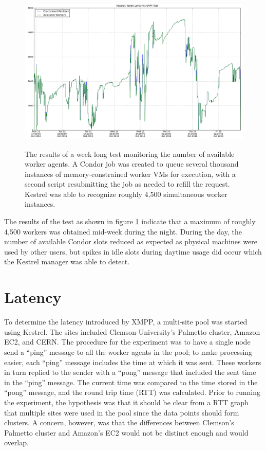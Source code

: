 \begin{figure}
\includegraphics[width=\columnwidth]{figures/week_plot}
\label{fig:Week-Plot}
\caption{The results of a week long test monitoring the number of available
worker agents. A Condor job was created to queue several thousand instances of
memory-constrained worker VMs for execution, with a second script resubmitting
the job as needed to refill the request. Kestrel was able to recognize roughly
4,500 simultaneous worker instances.}
\end{figure}

The results of the test as shown in figure \ref{fig:Week-Plot} indicate that a
maximum of roughly 4,500 workers was obtained mid-week during the night. During
the day, the number of available Condor slots reduced as expected as physical
machines were used by other users, but spikes in idle slots during daytime usage
did occur which the Kestrel manager was able to detect.

\section{Latency}
\label{sec:Latency}To determine the latency introduced by XMPP, a multi-site
pool was started using Kestrel. The sites included Clemson University's Palmetto
cluster, Amazon EC2, and CERN. The procedure for the experiment was to have a
single node send a ``ping'' message to all the worker agents in the pool; to
make processing easier, each ``ping'' message includes the time at which it was
sent. These workers in turn replied to the sender with a ``pong'' message that
included the sent time in the ``ping'' message. The current time was compared
to the time stored in the ``pong'' message, and the round trip time (RTT) was
calculated. Prior to running the experiment, the hypothesis was that it should
be clear from a RTT graph that multiple sites were used in the pool since the
data points should form clusters. A concern, however, was that the differences
between Clemson's Palmetto cluster and Amazon's EC2 would not be distinct enough
and would overlap.

